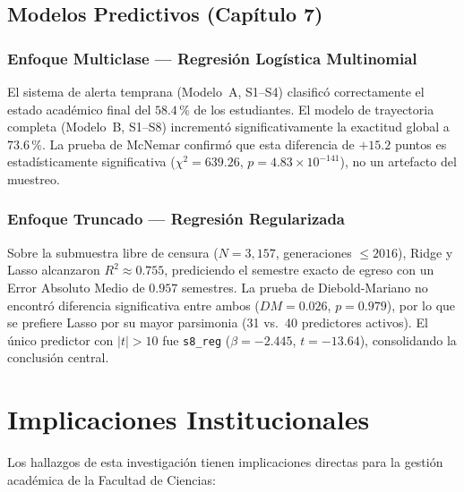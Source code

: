 \subsection{Modelos Predictivos (Capítulo 7)}

\subsubsection{Enfoque Multiclase --- Regresión Logística Multinomial}

El sistema de alerta temprana (Modelo~A, S1--S4) clasificó correctamente el estado académico
final del $58.4\,\%$ de los estudiantes. El modelo de
trayectoria completa (Modelo~B, S1--S8) incrementó significativamente la exactitud global a
$73.6\,\%$.
 La prueba de McNemar confirmó que esta diferencia de
$+15.2$ puntos es estadísticamente significativa ($\chi^2 = 639.26$,
$p = 4.83 \times 10^{-141}$), no un artefacto del muestreo.

\subsubsection{Enfoque Truncado — Regresión Regularizada}

Sobre la submuestra libre de censura ($N = 3{,}157$, generaciones $\leq 2016$), Ridge y Lasso
alcanzaron $R^2 \approx 0.755$, prediciendo el semestre exacto de egreso con un Error Absoluto
Medio de $0.957$ semestres. La prueba de Diebold-Mariano no encontró diferencia significativa
entre ambos ($DM = 0.026$, $p = 0.979$), por lo que se prefiere Lasso por su mayor parsimonia
(31 vs.\ 40 predictores activos). El único predictor con $|t| > 10$ fue \texttt{s8\_reg}
($\beta = -2.445$, $t = -13.64$), consolidando la conclusión central.

\section{Implicaciones Institucionales}

Los hallazgos de esta investigación tienen implicaciones directas para la gestión académica
de la Facultad de Ciencias:

